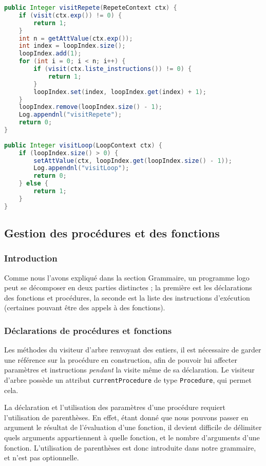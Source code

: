 \documentclass[a4paper,11pt]{article}
\begin{document}
\begin{lstlisting}[language=Java]
public Integer visitRepete(RepeteContext ctx) {
    if (visit(ctx.exp()) != 0) {
        return 1;
    }
    int n = getAttValue(ctx.exp());
    int index = loopIndex.size();
    loopIndex.add(1);
    for (int i = 0; i < n; i++) {
        if (visit(ctx.liste_instructions()) != 0) {
            return 1;
        }
        loopIndex.set(index, loopIndex.get(index) + 1);
    }
    loopIndex.remove(loopIndex.size() - 1);
    Log.appendnl("visitRepete");
    return 0;
}
    
public Integer visitLoop(LoopContext ctx) {
    if (loopIndex.size() > 0) {
        setAttValue(ctx, loopIndex.get(loopIndex.size() - 1));
        Log.appendnl("visitLoop");
        return 0;
    } else {
        return 1;
    }
}
\end{lstlisting}

\subsection{Gestion des procédures et des fonctions}
\subsubsection{Introduction}
Comme nous l'avons expliqué dans la section Grammaire, un programme logo peut se décomposer en deux parties distinctes ; la première est les déclarations des fonctions et procédures, la seconde est la liste des instructions d'exécution (certaines pouvant être des appels à des fonctions).

\subsubsection{Déclarations de procédures et fonctions}
Les méthodes du visiteur d'arbre renvoyant des entiers, il est nécessaire de garder une référence sur la procédure en construction, afin de pouvoir lui affecter paramètres et instructions \textit{pendant} la visite même de sa déclaration. Le visiteur d'arbre possède un attribut \lstinline$currentProcedure$ de type \lstinline$Procedure$, qui permet cela.

La déclaration et l'utilisation des paramètres d'une procédure requiert l'utilisation de parenthèses. En effet, étant donné que nous pouvons passer en argument le résultat de l'évaluation d'une fonction, il devient difficile de délimiter quels arguments appartiennent à quelle fonction, et le nombre d'arguments d'une fonction. L'utilisation de parenthèses est donc introduite dans notre grammaire, et n'est pas optionnelle.
\end{document}
